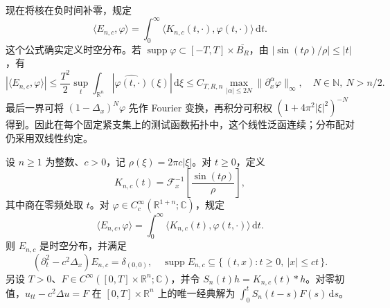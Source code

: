 现在将核在负时间补零，规定
\[
 \langle E_{n,c},\varphi\rangle
 =\int_0^\infty\langle K_{n,c}(t,\cdot),\varphi(t,\cdot)\rangle\,\mathrm{d}t.
\]
这个公式确实定义时空分布。若 \(\operatorname{supp}\varphi\subset[-T,T]\times\overline{B_R}\)，由 \(|\sin(t\rho)/\rho|\leq|t|\)，有
\[
 |\langle E_{n,c},\varphi\rangle|
 \leq\frac{T^2}{2}\sup_t\int_{\mathbb R^n}
            |\widehat{\varphi(t,\cdot)}(\xi)|\,\mathrm{d}\xi
 \leq C_{T,R,n}\max_{|\alpha|\leq2N}\|\partial_x^\alpha\varphi\|_\infty,
 \quad N\in\mathbb N,\ N>n/2.
\]
最后一界可将 \((1-\Delta_x)^N\varphi\) 先作 Fourier 变换，再积分可积权 \((1+4\pi^2|\xi|^2)^{-N}\) 得到。因此在每个固定紧支集上的测试函数拓扑中，这个线性泛函连续；分布配对仍采用双线性约定。

\begin{proposition}[延迟基本解]\label{b2:prop:11-retarded-fundamental}
设 \(n\geq1\) 为整数、\(c>0\)，记 \(\rho(\xi)=2\pi c|\xi|\)。对 \(t\geq0\)，定义
\[
 K_{n,c}(t)=\mathcal F_x^{-1}\left[\frac{\sin(t\rho)}{\rho}\right],
\]
其中商在零频处取 \(t\)。对 \(\varphi\in C_c^\infty(\mathbb R^{1+n};\mathbb C)\)，规定
\[
 \langle E_{n,c},\varphi\rangle
 =\int_0^\infty\langle K_{n,c}(t),\varphi(t,\cdot)\rangle\,\mathrm dt.
\]
则 \(E_{n,c}\) 是时空分布，并满足
\[
 (\partial_t^2-c^2\Delta_x)E_{n,c}=\delta_{(0,0)},\quad
 \operatorname{supp}E_{n,c}\subseteq\{\,(t,x):t\geq0,\ |x|\leq ct\,\}.
\]
另设 \(T>0\)、\(F\in C^\infty([0,T]\times\mathbb R^n;\mathbb C)\)，并令 \(S_n(t)h=K_{n,c}(t)*h\)。对零初值，\(u_{tt}-c^2\Delta u=F\) 在 \([0,T]\times\mathbb R^n\) 上的唯一经典解为 \(\int_0^tS_n(t-s)F(s)\,\mathrm{d}s\)。
\end{proposition}
